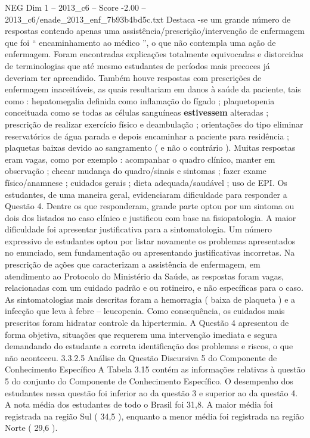 \begin{textsample}{NEG Dim 1 – 2013\_c6 – Score -2.00 – 2013\_c6/enade\_2013\_enf\_7b93b4bd5c.txt}
Destaca -se um grande número de respostas contendo apenas uma assistência/prescrição/intervenção de enfermagem que foi “ encaminhamento ao médico ”, o que não contempla uma ação de enfermagem.
Foram encontradas explicações totalmente equivocadas e distorcidas de terminologias que até mesmo estudantes de períodos mais precoces já deveriam ter apreendido.
Também houve respostas com prescrições de enfermagem inaceitáveis, as quais resultariam em danos à saúde da paciente, tais como : hepatomegalia definida como inflamação do fígado ; plaquetopenia conceituada como se todas as células sanguíneas \textbf{estivessem} alteradas ; prescrição de realizar exercício físico e deambulação ; orientações do tipo eliminar reservatórios de água parada e depois encaminhar a paciente para residência ; plaquetas baixas devido ao sangramento ( e não o contrário ).
Muitas respostas eram vagas, como por exemplo : acompanhar o quadro clínico, manter em observação ; checar mudança do quadro/sinais e sintomas ; fazer exame físico/anamnese ; cuidados gerais ; dieta adequada/saudável ; uso de EPI.
Os estudantes, de uma maneira geral, evidenciaram dificuldade para responder a Questão 4.
Dentre os que responderam, grande parte optou por um sintoma ou dois dos listados no caso clínico e justificou com base na fisiopatologia.
A maior dificuldade foi apresentar justificativa para a sintomatologia.
Um número expressivo de estudantes optou por listar novamente os problemas apresentados no enunciado, sem fundamentação ou apresentando justificativas incorretas.
Na prescrição de ações que caracterizam a assistência de enfermagem, em atendimento ao Protocolo do Ministério da Saúde, as respostas foram vagas, relacionadas com um cuidado padrão e ou rotineiro, e não específicas para o caso.
As sintomatologias mais descritas foram a hemorragia ( baixa de plaqueta ) e a infecção que leva à febre – leucopenia.
Como consequência, os cuidados mais prescritos foram hidratar controle da hipertermia.
A Questão 4 apresentou de forma objetiva, situações que requerem uma intervenção imediata e segura demandando do estudante a correta identificação dos problemas e riscos, o que não aconteceu. 3.3.2.5 Análise da Questão Discursiva 5 do Componente de Conhecimento Específico A Tabela 3.15 contém as informações relativas à questão 5 do conjunto do Componente de Conhecimento Específico.
O desempenho dos estudantes nessa questão foi inferior ao da questão 3 e superior ao da questão 4.
A nota média dos estudantes de todo o Brasil foi 31,8.
A maior média foi registrada na região Sul ( 34,5 ), enquanto a menor média foi registrada na região Norte ( 29,6 ).

\end{textsample}
